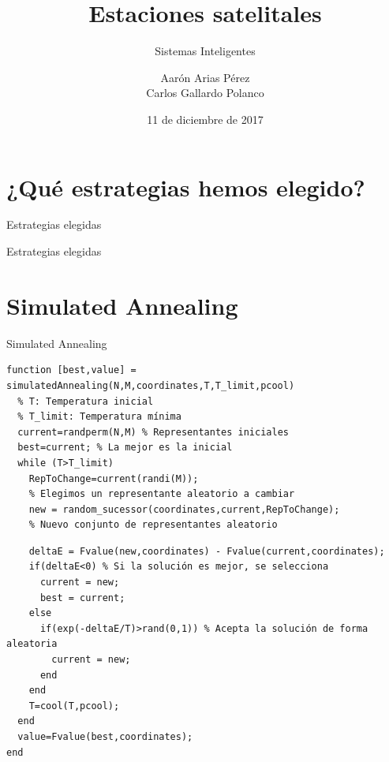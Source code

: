 \documentclass{beamer}
\title{Estaciones satelitales}
\subtitle{Sistemas Inteligentes}
\author{Aarón Arias Pérez \\ Carlos Gallardo Polanco}
\institute{Escuela Superior de Ingeniería\\Universidad de Cádiz}
\date{11 de diciembre de 2017}
\begin{document}
\frame{\titlepage}

\section{¿Qué estrategias hemos elegido?}
\begin{frame}{Estrategias elegidas}
  \begin{center}
  \end{center}
\end{frame}

\begin{frame}{Estrategias elegidas}
  \begin{center}
  \end{center}
\end{frame}

\section{Simulated Annealing}
\begin{frame}[fragile]{Simulated Annealing}
\begin{verbatim}
function [best,value] = simulatedAnnealing(N,M,coordinates,T,T_limit,pcool)
  % T: Temperatura inicial
  % T_limit: Temperatura mínima
  current=randperm(N,M) % Representantes iniciales
  best=current; % La mejor es la inicial
  while (T>T_limit)
    RepToChange=current(randi(M));
    % Elegimos un representante aleatorio a cambiar
    new = random_sucessor(coordinates,current,RepToChange);
    % Nuevo conjunto de representantes aleatorio
\end{verbatim}
\end{frame}

\begin{frame}[fragile]
\begin{verbatim}
    deltaE = Fvalue(new,coordinates) - Fvalue(current,coordinates);
    if(deltaE<0) % Si la solución es mejor, se selecciona
      current = new;
      best = current;
    else
      if(exp(-deltaE/T)>rand(0,1)) % Acepta la solución de forma aleatoria
        current = new;
      end
    end
    T=cool(T,pcool);
  end
  value=Fvalue(best,coordinates);
end
\end{verbatim}
\end{frame}
\end{document}
